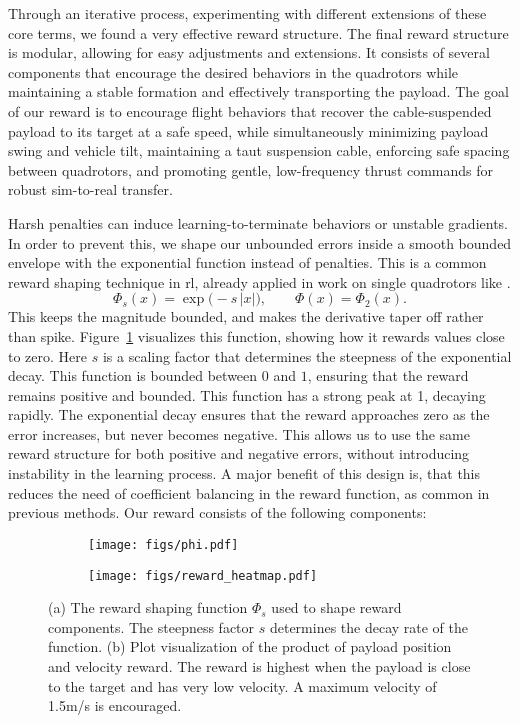 Through an iterative process, experimenting with different extensions of these core terms, we found a very effective reward structure. The final reward structure is modular, allowing for easy adjustments and extensions. It consists of several components that encourage the desired behaviors in the quadrotors while maintaining a stable formation and effectively transporting the payload.
The goal of our reward is to encourage flight behaviors that recover the cable-suspended payload to its target at a safe speed, while simultaneously minimizing payload swing and vehicle tilt, maintaining a taut suspension cable, enforcing safe spacing between quadrotors, and promoting gentle, low-frequency thrust commands for robust sim-to-real transfer. 

Harsh penalties can induce learning-to-terminate behaviors or unstable gradients. In order to prevent this, we shape our unbounded errors inside a smooth bounded envelope with the exponential function instead of penalties. This is a common reward shaping technique in \gls{rl}, already applied in work on single quadrotors like \cite{kaufmann_champion-level_2023}.
\begin{equation}
\Phi_s(x) = \exp\bigl(-s\,\lvert x\rvert\bigr),
\qquad
\Phi(x) = \Phi_2(x).
\end{equation}
 This keeps the magnitude bounded, and makes the derivative taper off rather than spike. Figure~\ref{fig:reward_details} visualizes this function, showing how it rewards values close to zero. Here $s$ is a scaling factor that determines the steepness of the exponential decay. This function is bounded between $0$ and $1$, ensuring that the reward remains positive and bounded. This function has a strong peak at 1, decaying rapidly. The exponential decay ensures that the reward approaches zero as the error increases, but never becomes negative. This allows us to use the same reward structure for both positive and negative errors, without introducing instability in the learning process. A major benefit of this design is, that this reduces the need of coefficient balancing in the reward function, as common in previous methods. Our reward consists of the following components:
\begin{figure}

  \centering
  \begin{subfigure}[t]{0.49\textwidth}
    \centering
    \texttt{[image: figs/phi.pdf]}
    \caption{}
  \end{subfigure}
  \begin{subfigure}[t]{0.49\textwidth}
    \centering
    \texttt{[image: figs/reward\_heatmap.pdf]}
    \caption{}
  \end{subfigure}
  \caption[Reward Components]{
    (a) The reward shaping function \(\Phi_s\) used to shape reward components. The steepness factor \(s\) determines the decay rate of the function.
    (b) Plot visualization of the product of payload position and velocity reward. The reward is highest when the payload is close to the target and has very low velocity. A maximum velocity of 1.5m/s is encouraged.
  }
  \label{fig:reward_details}
\end{figure}
